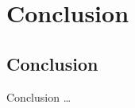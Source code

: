 \section{Conclusion}

\subsection{Conclusion}

\begin{frame}{Conclusion}
    \dots
\end{frame}
\note{
}

